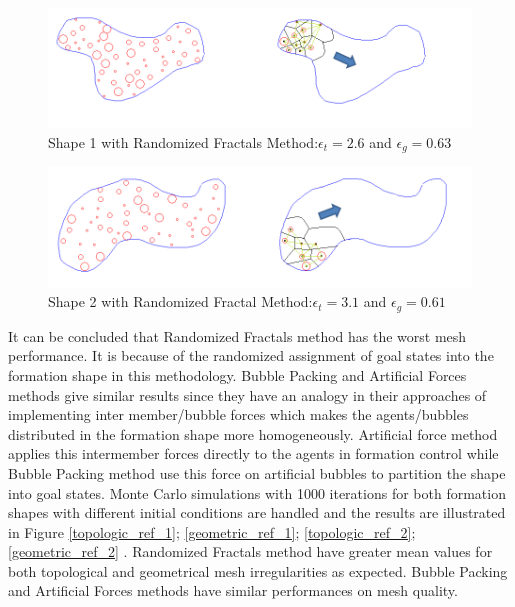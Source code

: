 \begin{figure}[H]
\caption{Shape 1 with Randomized Fractals Method:$\epsilon_t = 2.6$ and $\epsilon_g = 0.63$}
\centerline{\includegraphics[scale = 0.70]{Randomized_Fractals_Mesh_1}}
\end{figure} 	

\begin{figure}[H]
\caption{Shape 2 with Randomized Fractal Method:$\epsilon_t = 3.1$ and $\epsilon_g = 0.61$}
\centerline{\includegraphics[scale = 0.65]{Randomized_Fractals_Mesh_2}}
\end{figure} 	

It can be concluded that Randomized Fractals method has the worst mesh performance. It is because of the randomized assignment of goal states into the formation shape in this methodology. Bubble Packing and Artificial Forces methods give similar results since they have an analogy in their approaches of implementing inter member/bubble forces which makes the agents/bubbles distributed in the formation shape more homogeneously. Artificial force method applies this intermember forces directly to the agents in formation control while Bubble Packing method use this force on artificial bubbles to partition the shape into goal states. Monte Carlo simulations with 1000 iterations for both formation shapes with different initial conditions are handled and the results are illustrated in Figure \ref{topologic_ref_1}; \ref{geometric_ref_1}; \ref{topologic_ref_2}; \ref{geometric_ref_2} . Randomized Fractals method have greater mean values for both topological and geometrical mesh irregularities as expected.  Bubble Packing and Artificial Forces methods have similar performances on mesh quality.
		
